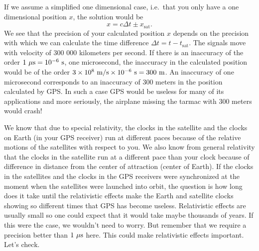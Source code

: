{\begin{multicols}{2}
If we assume a simplified one dimensional case, i.e.\ that you only have a one dimensional position $x$, the solution would be
\[
x=c\Delta t\pm x_\mathrm{sat}.
\]
We see that the precision of your calculated position $x$ depends on the precision with which we can calculate the time difference $\Delta t=t-t_\mathrm{sat}$. The signals move with  velocity of 300 000 kilometers per second. If there is an inaccuracy of the order $1{\rm\ \mu s}=10^{-6}{\rm\ s}$, one microsecond, the inaccuracy in the calculated position would be of the order $3\times 10^8{\rm\ m/s}\times10^{-6}{\rm\ s}=300{\rm\ m}$. An inaccuracy of one microsecond corresponds to an inaccuracy of 300 meters in the position calculated by GPS. In such a case GPS would be useless for many of its applications and more seriously, the airplane missing the tarmac with 300 meters would crash!

We know that due to special relativity, the clocks in the satellite and the clocks on Earth (in your GPS receiver) run at different paces because of the relative motions of the satellites with respect to you. We also know from general relativity that the clocks in the satellite run at a different pace than your clock because of difference in distance from the center of attraction (center of Earth). If the clocks in the satellites and the clocks in the GPS receivers were synchronized at the moment when the satellites were launched into orbit, the question is how long does it take until the relativistic effects make the Earth and satellite clocks showing so different times that GPS has become useless. Relativistic effects are usually small so one could expect that it would take maybe thousands of years. If this were the case, we wouldn't need to worry. But remember that we require a precision better than $1{\rm\ \mu s}$ here. This could make relativistic effects important. Let's check.


\end{multicols}}
